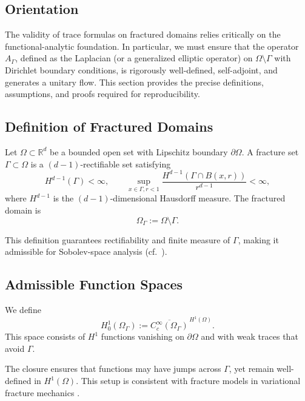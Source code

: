 \subsection*{Orientation}
The validity of trace formulas on fractured domains relies critically on the
functional-analytic foundation. In particular, we must ensure that the
operator $A_\Gamma$, defined as the Laplacian (or a generalized elliptic
operator) on $\Omega \setminus \Gamma$ with Dirichlet boundary conditions,
is rigorously well-defined, self-adjoint, and generates a unitary flow. This
section provides the precise definitions, assumptions, and proofs required
for reproducibility.

\subsection*{Definition of Fractured Domains}
\begin{definition}
Let $\Omega \subset \mathbb{R}^d$ be a bounded open set with Lipschitz
boundary $\partial\Omega$. A fracture set $\Gamma \subset \Omega$ is a
$(d-1)$-rectifiable set satisfying
\[
H^{d-1}(\Gamma) < \infty, \qquad
\sup_{x\in\Gamma, r<1} \frac{H^{d-1}(\Gamma\cap B(x,r))}{r^{d-1}} < \infty,
\]
where $H^{d-1}$ is the $(d-1)$-dimensional Hausdorff measure. The fractured
domain is
\[
\Omega_\Gamma := \Omega \setminus \Gamma.
\]
\end{definition}

This definition guarantees rectifiability and finite measure of $\Gamma$,
making it admissible for Sobolev-space analysis
(cf.~\cite{Federer1969,MazyaPlamenevskii1980}).

\subsection*{Admissible Function Spaces}
\begin{definition}
We define
\[
H^1_0(\Omega_\Gamma) :=
\overline{C_c^\infty(\Omega_\Gamma)}^{\,H^1(\Omega)}.
\]
This space consists of $H^1$ functions vanishing on $\partial\Omega$ and
with weak traces that avoid $\Gamma$. 
\end{definition}

\begin{remark}
The closure ensures that functions may have jumps across $\Gamma$, yet
remain well-defined in $H^1(\Omega)$. This setup is consistent with fracture
models in variational fracture mechanics
\cite{BourdinFrancfortMarigo2008,Braides2002}.
\end{remark}

